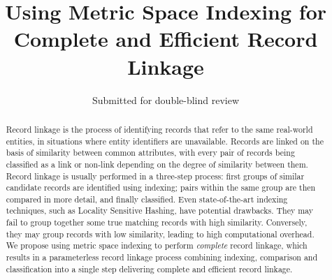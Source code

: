 \documentclass{llncs}
\begin{document}
       
\title{Using Metric Space Indexing for Complete and Efficient Record Linkage}


\author{Submitted for double-blind review}

\maketitle

\begin{abstract}

Record linkage is the process of identifying records that refer to the
same real-world entities, in situations where entity identifiers are
unavailable. Records are linked on the basis of similarity between
common attributes, with every pair of records being classified as a
link or non-link depending on the degree of similarity between them.
Record linkage is usually performed in a three-step process: first
groups of similar candidate records are identified using indexing; 
pairs within the same group are then compared in more detail, and
finally classified.
%
Even state-of-the-art indexing techniques, such as Locality Sensitive
Hashing, have potential drawbacks. They may fail to group together some
true matching records with high similarity. Conversely, they may group
records with low similarity, leading to high computational overhead.
%
We propose using metric space indexing to perform \emph{complete} record
linkage, which results in a parameterless record linkage process
combining indexing, comparison and classification into a single step
delivering complete and efficient record linkage.

\end{abstract}
\end{document}
